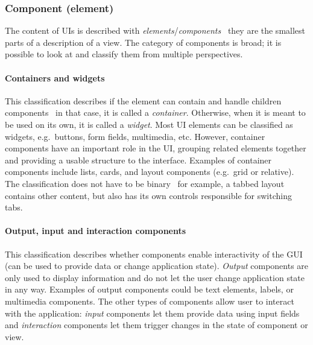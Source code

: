 \subsubsection{Component (element)}
The content of UIs is described with \emph{elements}/\emph{components} \textendash\ they are the smallest parts of a description of a view.
The category of components is broad;
it is possible to look at and classify them from multiple perspectives.

\paragraph{Containers and widgets}
This classification describes if the element can contain and handle children components \textendash\ in that case, it is called a \emph{container}.
Otherwise, when it is meant to be used on its own, it is called a \emph{widget}.
Most UI elements can be classified as widgets, e.g.\ buttons, form fields, multimedia, etc.
However, container components have an important role in the UI, grouping related elements together and providing a usable structure to the interface.
Examples of container components include lists, cards, and layout components (e.g.\ grid or relative).
The classification does not have to be binary \textendash\ for example, a tabbed layout contains other content, but also has its own controls responsible for switching tabs.

\paragraph{Output, input and interaction components}
This classification describes whether components enable interactivity of the GUI (can be used to provide data or change application state).
\emph{Output} components are only used to display information and do not let the user change application state in any way.
Examples of output components could be text elements, labels, or multimedia components.
The other types of components allow user to interact with the application: \emph{input} components let them provide data using input fields and \emph{interaction} components let them trigger changes in the state of component or view.

